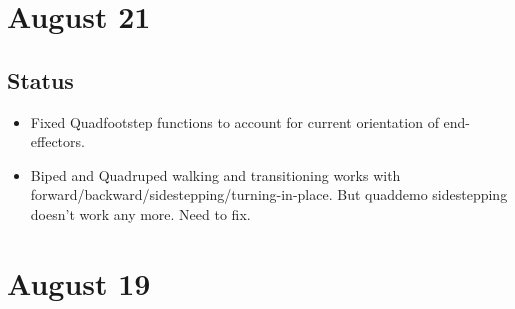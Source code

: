 \documentclass[letterpaper, 10 pt]{report}
\begin{document}
\section*{August 21}
\subsection*{Status}
\begin{itemize}
\item Fixed Quadfootstep functions to account for current orientation of end-effectors.
\item Biped and Quadruped walking and transitioning works with forward/backward/sidestepping/turning-in-place. But quaddemo sidestepping doesn't work any more. Need to fix.
\end{itemize}

\section*{August 19}
\end{document}
